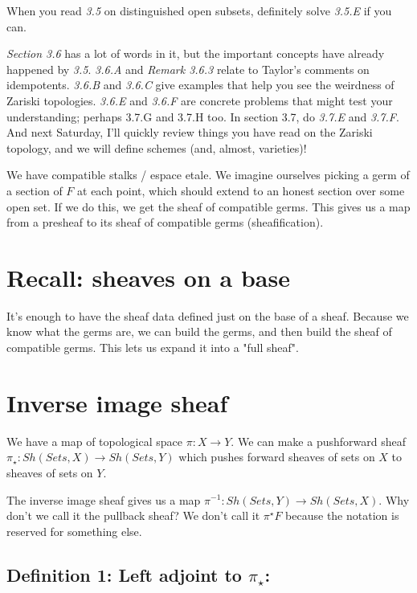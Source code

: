 \documentclass{book}
\theoremstyle{definition}
\begin{document}
\begin{itemize}
    When you read \emph{3.5} on distinguished open subsets, definitely solve \emph{3.5.E} if
    you can.

    \emph{Section 3.6} has a lot of words in it, but the important concepts have
    already happened by \emph{3.5}. \emph{3.6.A} and \emph{Remark 3.6.3} relate to Taylor’s
    comments on idempotents. \emph{3.6.B} and \emph{3.6.C} give examples that help you
    see the weirdness of Zariski topologies. \emph{3.6.E} and \emph{3.6.F} are concrete
    problems that might test your understanding; perhaps 3.7.G and 3.7.H
    too.  In section 3.7, do \emph{3.7.E} and \emph{3.7.F}.
    And next Saturday, I’ll quickly review things you have read on the Zariski
    topology, and we will define schemes (and, almost, varieties)!



\end{itemize}


We have compatible stalks / espace etale. We imagine ourselves picking a germ
of a section of $F$ at each point, which should extend to an honest
section over some open set. If we do this, we get the sheaf of compatible
germs. This gives us a map from a presheaf to its sheaf of compatible
germs (sheafification).

\section{Recall: sheaves on a base}

It's enough to have the sheaf data defined just on the base of a sheaf.
Because we know what the germs are, we can build the germs, and then
build the sheaf of compatible germs. This lets us expand it into
a "full sheaf".

\section{Inverse image sheaf}

We have a map of topological space $\pi: X \rightarrow Y$. We can make a pushforward
sheaf $\pi_\star: Sh(Sets, X) \rightarrow Sh(Sets, Y)$ which pushes forward
sheaves of sets on $X$ to sheaves of sets on $Y$.

The inverse image sheaf gives us a map $\pi^{-1}: Sh(Sets, Y) \rightarrow Sh(Sets, X)$.
Why don't we call it the pullback sheaf?  We don't call it $\pi^\star F$ because
the notation is reserved for something else.


\subsection{Definition 1: Left adjoint to $\pi_\star$:}
\end{document}
